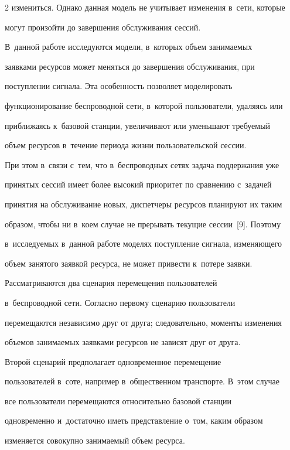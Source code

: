 \begin{multicols}{2}
измениться. Однако данная модель не учитывает изменения в~сети, которые 

могут произойти до завершения обслуживания сессий. 

  

  В~данной работе исследуются модели, в~которых объем занимаемых 

заявками ресурсов может меняться до завершения обслуживания, при 

поступлении сигнала. Эта особенность позволяет моделировать 

функционирование беспроводной сети, в~которой пользователи, удаляясь или 

приближаясь к~базовой станции, увеличивают или уменьшают требуемый 

объем ресурсов в~течение периода жизни пользовательской сессии. 


  При этом в~связи с~тем, что в~беспроводных сетях задача поддержания уже 

принятых сессий имеет более высокий приоритет по сравнению с~задачей 

принятия на обслуживание новых, диспетчеры ресурсов планируют их таким 

образом, чтобы ни в~коем случае не прерывать текущие сессии~[9]. Поэтому 

в~исследуемых в~данной работе моделях поступление сигнала, изменяющего 

объем занятого заявкой ресурса, не может привести к~потере заявки.

  

  Рассматриваются два сценария перемещения пользователей 

в~беспроводной сети. Согласно первому сценарию пользователи 

перемещаются независимо друг от друга; следовательно, моменты изменения 

объемов занимаемых заявками ресурсов не зависят друг от друга. 

  

  Второй сценарий предполагает одновременное перемещение 

пользователей в~соте, например в~общест\-венном транспорте. В~этом случае 

все пользователи перемещаются относительно базовой станции 

одновременно и~достаточно иметь пред\-став\-ле\-ние о~том, каким образом 

изменяется совокупно занимаемый объем ресурса.


\end{multicols}

